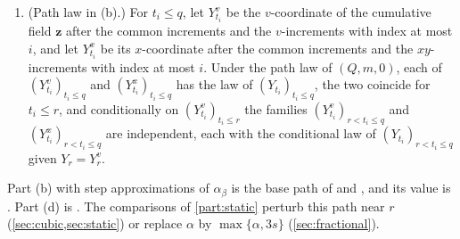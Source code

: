 \begin{lemma}
\begin{enumerate}[label=\textup{(\alph*)}]
\item \textup{(Path law in (b).)} For $t_i\le q$, let $Y^v_{t_i}$ be the
 $v$-coordinate of the cumulative field $\mathbf z$ after the common
 increments and the $v$-increments with index at most $i$, and let $Y^x_{t_i}$
 be its $x$-coordinate after the common increments and the $xy$-increments with
 index at most $i$. Under the path law of $(Q,m,0)$, each of
 $(Y^v_{t_i})_{t_i\le q}$ and $(Y^x_{t_i})_{t_i\le q}$ has the law of
 $(Y_{t_i})_{t_i\le q}$, the two coincide for $t_i\le r$, and conditionally on
 $(Y^v_{t_i})_{t_i\le r}$ the families $(Y^v_{t_i})_{r<t_i\le q}$ and
 $(Y^x_{t_i})_{r<t_i\le q}$ are independent, each with the conditional law of
 $(Y_{t_i})_{r<t_i\le q}$ given $Y_r=Y^v_r$.
\end{enumerate}
\end{lemma}

Part (b) with step approximations of $\alpha_\beta$ is the base path of
\cite[Section~4.2]{oai-barriers} and \cite[Section~7, Step~1]{oai-barriers},
and its value is \cite[(7.7)]{oai-barriers}. Part (d) is
\cite[(4.6)]{oai-barriers}. The comparisons of \cref{part:static} perturb this
path near $r$ (\cref{sec:cubic,sec:static}) or replace $\alpha$ by
$\max\{\alpha,3s\}$ (\cref{sec:fractional}).

